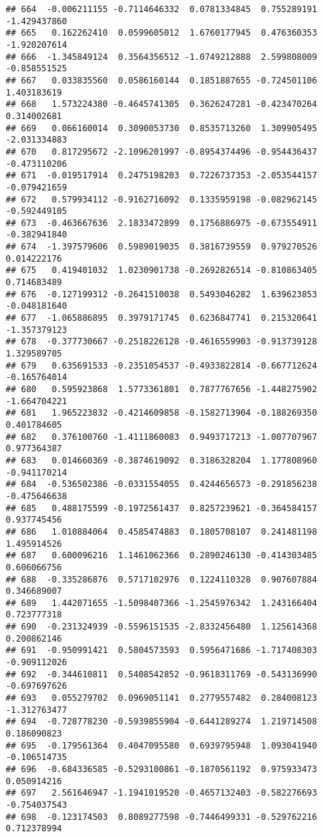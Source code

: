 \documentclass[
]{article}
\begin{document}
\begin{verbatim}
## 664  -0.006211155 -0.7114646332  0.0781334845  0.755289191 -1.429437860
## 665   0.162262410  0.0599605012  1.6760177945  0.476360353 -1.920207614
## 666  -1.345849124  0.3564356512 -1.0749212888  2.599808009 -0.858551525
## 667   0.033835560  0.0586160144  0.1851887655 -0.724501106  1.403183619
## 668   1.573224380 -0.4645741305  0.3626247281 -0.423470264  0.314002681
## 669   0.066160014  0.3090053730  0.8535713260  1.309905495 -2.031334883
## 670   0.817295672 -2.1096201997 -0.8954374496 -0.954436437 -0.473110206
## 671  -0.019517914  0.2475198203  0.7226737353 -2.053544157 -0.079421659
## 672   0.579934112 -0.9162716092  0.1335959198 -0.082962145 -0.592449105
## 673  -0.463667636  2.1833472899  0.1756886975 -0.673554911 -0.382941840
## 674  -1.397579606  0.5989019035  0.3816739559  0.979270526  0.014222176
## 675   0.419401032  1.0230901738 -0.2692826514 -0.810863405  0.714683489
## 676  -0.127199312 -0.2641510038  0.5493046282  1.639623853 -0.048181640
## 677  -1.065886895  0.3979171745  0.6236847741  0.215320641 -1.357379123
## 678  -0.377730667 -0.2518226128 -0.4616559903 -0.913739128  1.329589705
## 679   0.635691533 -0.2351054537 -0.4933822814 -0.667712624 -0.165764014
## 680   0.595923868  1.5773361801  0.7877767656 -1.448275902 -1.664704221
## 681   1.965223832 -0.4214609858 -0.1582713904 -0.188269350  0.401784605
## 682   0.376100760 -1.4111860083  0.9493717213 -1.007707967  0.977364387
## 683   0.014660369 -0.3874619092  0.3186328204  1.177808960 -0.941170214
## 684  -0.536502386 -0.0331554055  0.4244656573 -0.291856238 -0.475646638
## 685   0.488175599 -0.1972561437  0.8257239621 -0.364584157  0.937745456
## 686   1.010884064  0.4585474883  0.1805708107  0.241481198  1.495914526
## 687   0.600096216  1.1461062366  0.2890246130 -0.414303485  0.606066756
## 688  -0.335286876  0.5717102976  0.1224110328  0.907607884  0.346689007
## 689   1.442071655 -1.5098407366 -1.2545976342  1.243166404  0.723777318
## 690  -0.231324939 -0.5596151535 -2.8332456480  1.125614368  0.200862146
## 691  -0.950991421  0.5804573593  0.5956471686 -1.717408303 -0.909112026
## 692  -0.344610811  0.5408542852 -0.9618311769 -0.543136990 -0.697697626
## 693   0.055279702  0.0969051141  0.2779557482  0.284008123 -1.312763477
## 694  -0.728778230 -0.5939855904 -0.6441289274  1.219714508  0.186090823
## 695  -0.179561364  0.4047095580  0.6939795948  1.093041940 -0.106514735
## 696  -0.684336585 -0.5293100861 -0.1870561192  0.975933473  0.050914216
## 697   2.561646947 -1.1941019520 -0.4657132403 -0.582276693 -0.754037543
## 698  -0.123174503  0.8089277598 -0.7446499331 -0.529762216  0.712378994

\end{verbatim}
\end{document}
